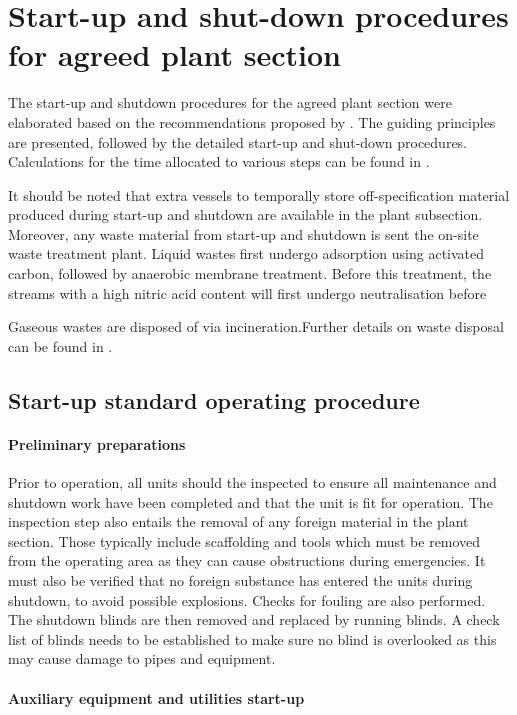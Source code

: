 \section{Start-up and shut-down procedures for agreed plant section}
The start-up and shutdown procedures for the agreed plant section were elaborated based on the recommendations proposed by \textcite{bp_international_safe_2006}. The guiding principles are presented, followed by the detailed start-up and shut-down procedures. Calculations for the time allocated to various steps can be found in .

It should be noted that extra vessels to temporally store off-specification material produced during start-up and shutdown are available in the plant subsection. Moreover, any waste material from start-up and shutdown is sent the on-site waste treatment plant. Liquid wastes first undergo adsorption using activated carbon, followed by anaerobic membrane treatment. Before this treatment, the streams with a high nitric acid content will first undergo neutralisation before 

Gaseous wastes are disposed of via incineration.Further details on waste disposal can be found in .

\subsection{Start-up standard operating procedure}

\paragraph{Preliminary preparations}
Prior to operation, all units should the inspected to ensure all maintenance and shutdown work have been completed and that the unit is fit for operation. The inspection step also entails the removal of any foreign material in the plant section. Those typically include scaffolding and tools which must be removed from the operating area as they can cause obstructions during emergencies. It must also be verified that no foreign substance has entered the units during shutdown, to avoid possible explosions. Checks for fouling are also performed. The shutdown blinds are then removed and replaced by running blinds. A check list of blinds needs to be established to make sure no blind is overlooked as this may cause damage to pipes and equipment.



\paragraph{Auxiliary equipment and utilities start-up}


